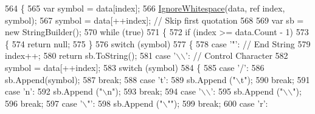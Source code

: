 \begin{DoxyCode}
564         \{
565             var symbol = data[index];
566             \hyperlink{a00060_a2c524a3d0510dd2e4ec91dd63acbf61d}{IgnoreWhitespace}(data, ref index, symbol);
567             symbol = data[++index]; \textcolor{comment}{// Skip first quotation}
568 
569             var sb = \textcolor{keyword}{new} StringBuilder();
570             \textcolor{keywordflow}{while} (\textcolor{keyword}{true})
571             \{
572                 \textcolor{keywordflow}{if} (index >= data.Count - 1)
573                 \{
574                     \textcolor{keywordflow}{return} null;
575                 \}
576                 \textcolor{keywordflow}{switch} (symbol)
577                 \{
578                     \textcolor{keywordflow}{case} \textcolor{charliteral}{'"'}:  \textcolor{comment}{// End String}
579                         index++;
580                         \textcolor{keywordflow}{return} sb.ToString();
581                     \textcolor{keywordflow}{case} \textcolor{charliteral}{'\(\backslash\)\(\backslash\)'}: \textcolor{comment}{// Control Character}
582                         symbol = data[++index];
583                         \textcolor{keywordflow}{switch} (symbol)
584                         \{
585                             \textcolor{keywordflow}{case} \textcolor{charliteral}{'/'}:
586                                 sb.Append(symbol);
587                                 \textcolor{keywordflow}{break};
588                             \textcolor{keywordflow}{case} \textcolor{charliteral}{'t'}:
589                                 sb.Append (\textcolor{stringliteral}{"\(\backslash\)t"});
590                                 \textcolor{keywordflow}{break};
591                             \textcolor{keywordflow}{case} \textcolor{charliteral}{'n'}:
592                                 sb.Append (\textcolor{stringliteral}{"\(\backslash\)n"});
593                                 \textcolor{keywordflow}{break};
594                             \textcolor{keywordflow}{case} \textcolor{charliteral}{'\(\backslash\)\(\backslash\)'}:
595                                 sb.Append (\textcolor{stringliteral}{"\(\backslash\)\(\backslash\)"});
596                                 \textcolor{keywordflow}{break};
597                             \textcolor{keywordflow}{case} \textcolor{charliteral}{'\(\backslash\)"'}:
598                                 sb.Append (\textcolor{stringliteral}{"\(\backslash\)""});
599                                 \textcolor{keywordflow}{break};
600                             \textcolor{keywordflow}{case} \textcolor{charliteral}{'r'}:

\end{DoxyCode}
